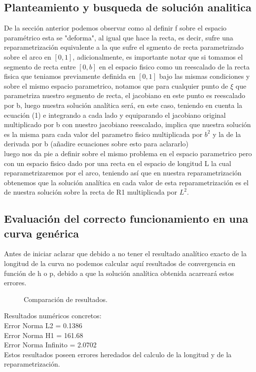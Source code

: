 \documentclass[12pt]{article}
\begin{document}
\subsection{Planteamiento y busqueda de solución analitica}
De la sección anterior podemos observar como al definir f sobre el espacio paramétrico esta se "deforma", al igual que hace la recta,
es decir, sufre una reparametrización equivalente a la que sufre el sgmento de recta parametrizado sobre el arco en $[0,1]$, adicionalmente,
es importante notar que si tomamos el segmento de recta entre $[0,b]$ en el espacio fisico como un reescalado de la recta fisica que teniamos previamente
definida en $[0,1]$ bajo las mismas condiciones y sobre el mismo espacio parametrico, notamos que para cualquier punto de $\xi$ que parametriza nuestro segmento de recta,
el jacobiano en este punto es reescalado por b, luego nuestra solución analítica será, en este caso, teniendo en cuenta la ecuación (1) e integrando a cada lado y equiparando
el jacobiano original multiplicado por b con nuestro jacobiano reescalado, implica que nuestra solución es la misma para cada valor del parametro fisico multiplicada por $b^2$ y la de
la derivada por b (añadire ecuaciones sobre esto para aclararlo)\\ 
luego nos da pie a definir sobre el mismo problema en el espacio parametrico pero con un espacio fisico dado por una recta en el espacio de longitud L la cual reparametrizaremos por el arco,
teniendo así que en nuestra reparametrización obtenemos que la solución analítica en cada valor de esta reparametrización es el de nuestra solución sobre la recta de R1 multiplicada por $L^2$.
\subsection{Evaluación del correcto funcionamiento en una curva genérica}
Antes de iniciar aclarar que debido a no tener el resultado analítico exacto de la longitud de la curva no podemos calcular aquí resultados de convergencia en función de h o p, debido a que 
la solución analítica obtenida acarreará estos errores.
\begin{figure}[H]
    \centering
    \begin{subfigure}{0.32\textwidth}
        
    \end{subfigure}
    \hfill
    \begin{subfigure}{0.32\textwidth}
        
    \end{subfigure}
    \hfill
    \begin{subfigure}{0.32\textwidth}
        
    \end{subfigure}
    \caption{Comparación de resultados.}
    \label{fig:tresgraficas}
\end{figure}
Resultados numéricos concretos:\\
Error Norma L2 = 0.1386\\
Error Norma H1 = 161.68\\
Error Norma Infinito = 2.0702\\
Estos resultados poseen errores heredados del calculo de la longitud y de la reparametrización.
\end{document}
